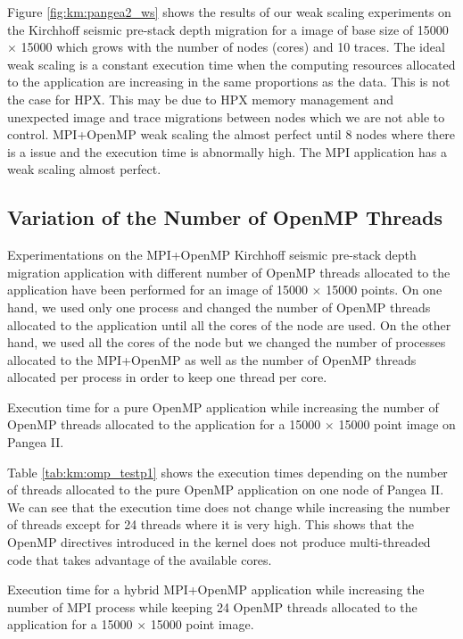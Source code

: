Figure \ref{fig:km:pangea2_ws} shows the results of our weak scaling experiments on the Kirchhoff seismic pre-stack depth migration for a image of base size of 15000 $\times$ 15000 which grows with the number of nodes (cores) and 10 traces.
The ideal weak scaling is a constant execution time when the computing resources allocated to the application are increasing in the same proportions as the data.
This is not the case for HPX.
This may be due to HPX memory management and unexpected image and trace migrations between nodes which we are not able to control.
MPI+OpenMP weak scaling the almost perfect until 8 nodes where there is a issue and the execution time is abnormally high.
The MPI application has a weak scaling almost perfect.

\subsection{Variation of the Number of OpenMP Threads}
Experimentations on the MPI+OpenMP Kirchhoff seismic pre-stack depth migration application with different number of OpenMP threads allocated to the application have been performed for an image of 15000 $\times$ 15000 points.
On one hand, we used only one process and changed the number of OpenMP threads allocated to the application until all the cores of the node are used.
On the other hand, we used all the cores of the node but we changed the number of processes allocated to the MPI+OpenMP as well as the number of OpenMP threads allocated per process in order to keep one thread per core.

\begin{table}[H]
	\centering
	
	\caption{Execution time for a pure OpenMP application while increasing the number of OpenMP threads allocated to the application for a 15000 $\times$ 15000 point image on Pangea II. \label{tab:km:omp_testp1}}
\end{table}

Table \ref{tab:km:omp_testp1} shows the execution times depending on the number of threads allocated to the pure OpenMP application on one node of Pangea II.
We can see that the execution time does not change while increasing the number of threads except for 24 threads where it is very high.
This shows that the OpenMP directives introduced in the kernel does not produce multi-threaded code that takes advantage of the available cores.

\begin{table}[H]
	\centering
	
	\caption{Execution time for a hybrid MPI+OpenMP application while increasing the number of MPI process while keeping 24 OpenMP threads allocated to the application for a 15000 $\times$ 15000 point image. \label{tab:km:omp_testpm}}
\end{table}

